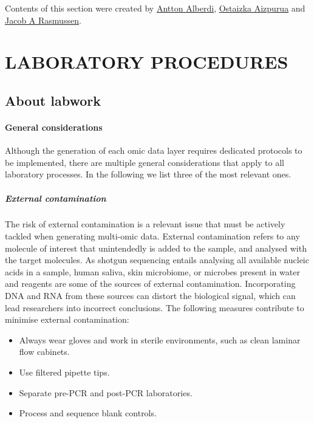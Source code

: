 \documentclass[
]{book}
\providecommand{\tightlist}{%
  \setlength{\itemsep}{0pt}\setlength{\parskip}{0pt}}
\begin{document}
Contents of this section were created by \protect\hyperlink{antton-alberdi}{Antton Alberdi}, \protect\hyperlink{ostaizka-aizpurua}{Ostaizka Aizpurua} and \protect\hyperlink{jacob-rasmussen}{Jacob A Rasmussen}.

\hypertarget{part-laboratory-procedures}{%
\part{LABORATORY PROCEDURES}\label{part-laboratory-procedures}}

\hypertarget{about-labwork}{%
\chapter{About labwork}\label{about-labwork}}

\hypertarget{laboratory-general-considerations}{%
\subsection*{General considerations}\label{laboratory-general-considerations}}

Although the generation of each omic data layer requires dedicated protocols to be implemented, there are multiple general considerations that apply to all laboratory processes. In the following we list three of the most relevant ones.

\hypertarget{external-contamination}{%
\subsubsection*{External contamination}\label{external-contamination}}

The risk of external contamination is a relevant issue that must be actively tackled when generating multi-omic data. External contamination refers to any molecule of interest that unintendedly is added to the sample, and analysed with the target molecules. As shotgun sequencing entails analysing all available nucleic acids in a sample, human saliva, skin microbiome, or microbes present in water and reagents are some of the sources of external contamination. Incorporating DNA and RNA from these sources can distort the biological signal, which can lead researchers into incorrect conclusions. The following measures contribute to minimise external contamination:

\begin{itemize}
\tightlist
\item
  Always wear gloves and work in sterile environments, such as clean laminar flow cabinets.
\item
  Use filtered pipette tips.
\item
  Separate pre-PCR and post-PCR laboratories.
\item
  Process and sequence blank controls.
\end{itemize}
\end{document}
